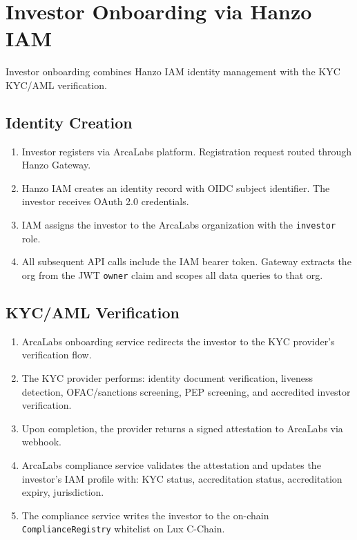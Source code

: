\section{Investor Onboarding via Hanzo IAM}

\label{sec:onboarding}

Investor onboarding combines Hanzo IAM identity management with the KYC
KYC/AML verification.

\subsection{Identity Creation}

\begin{enumerate}[leftmargin=1.4em]
    \item Investor registers via ArcaLabs platform. Registration request
    routed through Hanzo Gateway.
    \item Hanzo IAM creates an identity record with OIDC subject
    identifier. The investor receives OAuth 2.0 credentials.
    \item IAM assigns the investor to the ArcaLabs organization with
    the \texttt{investor} role.
    \item All subsequent API calls include the IAM bearer token. Gateway
    extracts the org from the JWT \texttt{owner} claim and scopes all
    data queries to that org.
\end{enumerate}

\subsection{KYC/AML Verification}

\begin{enumerate}[leftmargin=1.4em]
    \item ArcaLabs onboarding service redirects the investor to
    the KYC provider's verification flow.
    \item The KYC provider performs: identity document verification, liveness
    detection, OFAC/sanctions screening, PEP screening, and accredited
    investor verification.
    \item Upon completion, the provider returns a signed attestation to
    ArcaLabs via webhook.
    \item ArcaLabs compliance service validates the attestation and
    updates the investor's IAM profile with: KYC status, accreditation
    status, accreditation expiry, jurisdiction.
    \item The compliance service writes the investor to the on-chain
    \texttt{ComplianceRegistry} whitelist on Lux C-Chain.
\end{enumerate}

